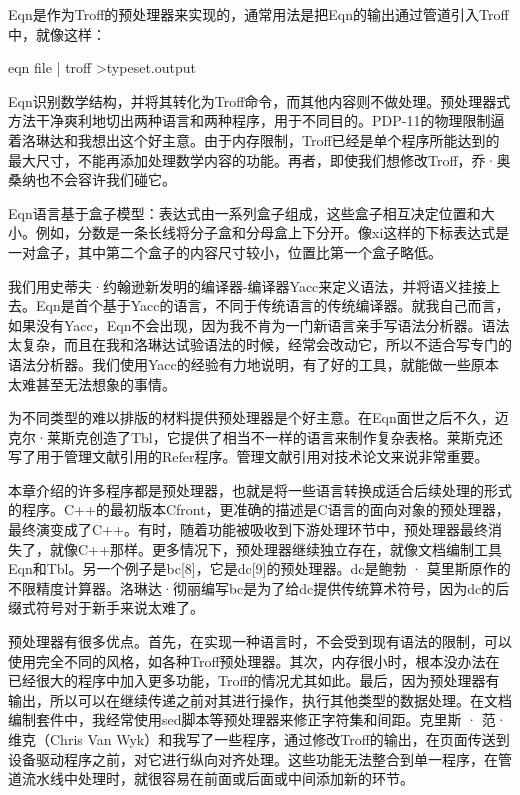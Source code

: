 \documentclass[a4paper,12pt,UTF8,twoside]{ctexbook}
\begin{document}
{{Eqn是作为Troff的预处理器来实现的，通常用法是把Eqn的输出通过管道引入Troff中，就像这样：

eqn file | troff >typeset.output

Eqn识别数学结构，并将其转化为Troff命令，而其他内容则不做处理。预处理器式方法干净爽利地切出两种语言和两种程序，用于不同目的。PDP-11的物理限制逼着洛琳达和我想出这个好主意。由于内存限制，Troff已经是单个程序所能达到的最大尺寸，不能再添加处理数学内容的功能。再者，即使我们想修改Troff，乔·奥桑纳也不会容许我们碰它。

Eqn语言基于盒子模型：表达式由一系列盒子组成，这些盒子相互决定位置和大小。例如，分数是一条长线将分子盒和分母盒上下分开。像xi这样的下标表达式是一对盒子，其中第二个盒子的内容尺寸较小，位置比第一个盒子略低。

我们用史蒂夫·约翰逊新发明的编译器-编译器Yacc来定义语法，并将语义挂接上去。Eqn是首个基于Yacc的语言，不同于传统语言的传统编译器。就我自己而言，如果没有Yacc，Eqn不会出现，因为我不肯为一门新语言亲手写语法分析器。语法太复杂，而且在我和洛琳达试验语法的时候，经常会改动它，所以不适合写专门的语法分析器。我们使用Yacc的经验有力地说明，有了好的工具，就能做一些原本太难甚至无法想象的事情。

为不同类型的难以排版的材料提供预处理器是个好主意。在Eqn面世之后不久，迈克尔·莱斯克创造了Tbl，它提供了相当不一样的语言来制作复杂表格。莱斯克还写了用于管理文献引用的Refer程序。管理文献引用对技术论文来说非常重要。

本章介绍的许多程序都是预处理器，也就是将一些语言转换成适合后续处理的形式的程序。C++的最初版本Cfront，更准确的描述是C语言的面向对象的预处理器，最终演变成了C++。有时，随着功能被吸收到下游处理环节中，预处理器最终消失了，就像C++那样。更多情况下，预处理器继续独立存在，就像文档编制工具Eqn和Tbl。另一个例子是bc[8]，它是dc[9]的预处理器。dc是鲍勃 · 莫里斯原作的不限精度计算器。洛琳达·彻丽编写bc是为了给dc提供传统算术符号，因为dc的后缀式符号对于新手来说太难了。

预处理器有很多优点。首先，在实现一种语言时，不会受到现有语法的限制，可以使用完全不同的风格，如各种Troff预处理器。其次，内存很小时，根本没办法在已经很大的程序中加入更多功能，Troff的情况尤其如此。最后，因为预处理器有输出，所以可以在继续传递之前对其进行操作，执行其他类型的数据处理。在文档编制套件中，我经常使用sed脚本等预处理器来修正字符集和间距。克里斯 · 范·维克（Chris Van Wyk）和我写了一些程序，通过修改Troff的输出，在页面传送到设备驱动程序之前，对它进行纵向对齐处理。这些功能无法整合到单一程序，在管道流水线中处理时，就很容易在前面或后面或中间添加新的环节。





}}
\end{document}
